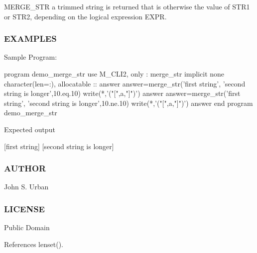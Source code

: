 M\+E\+R\+G\+E\+\_\+\+S\+TR a trimmed string is returned that is otherwise the value of S\+T\+R1 or S\+T\+R2, depending on the logical expression E\+X\+PR.

\subsubsection*{E\+X\+A\+M\+P\+L\+ES}

Sample Program\+: \begin{DoxyVerb}program demo_merge_str
use M_CLI2, only : merge_str
implicit none
character(len=:), allocatable :: answer
   answer=merge_str('first string', 'second string is longer',10.eq.10)
   write(*,'("[",a,"]")') answer
   answer=merge_str('first string', 'second string is longer',10.ne.10)
   write(*,'("[",a,"]")') answer
end program demo_merge_str
\end{DoxyVerb}


Expected output

\mbox{[}first string\mbox{]} \mbox{[}second string is longer\mbox{]} \subsubsection*{A\+U\+T\+H\+OR}

John S. Urban \subsubsection*{L\+I\+C\+E\+N\+SE}

Public Domain 

References lenset().


